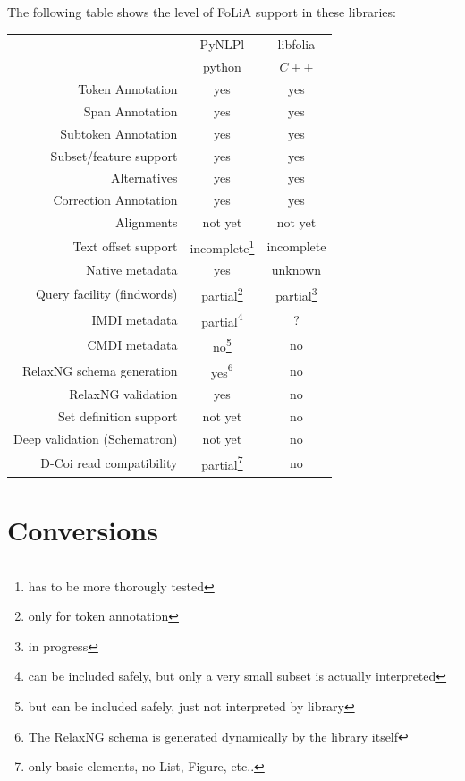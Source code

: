 \documentclass[a4paper,12pt]{report}
\begin{document}
The following table shows the level of FoLiA support in these libraries:

\begin{tabular}{|r|c|c|}
\hline
                        & PyNLPl & libfolia  \\
                        & python & $C++$ \\
\hline
Token Annotation        & yes & yes \\
Span Annotation         & yes & yes \\
Subtoken Annotation     & yes & yes \\
Subset/feature support  & yes & yes \\
Alternatives            & yes & yes \\
Correction Annotation   & yes & yes \\
Alignments              & not yet & not yet \\
Text offset support     & incomplete\footnote{has to be more thorougly tested} & incomplete \\
Native metadata         & yes & unknown \\
\hline
Query facility (findwords) & partial\footnote{only for token annotation} & partial\footnote{in progress} \\
\hline
IMDI metadata           & partial\footnote{can be included safely, but only a very small subset is actually interpreted} & ? \\
CMDI metadata           & no\footnote{but can be included safely, just not interpreted by library} & no \\
RelaxNG schema generation & yes\footnote{The RelaxNG schema is generated dynamically by the library itself} & no \\
RelaxNG validation      & yes & no \\
Set definition support  & not yet & no \\
Deep validation (Schematron)  & not yet & no \\
D-Coi read compatibility      & partial\footnote{only basic elements, no List, Figure, etc..} & no \\
\hline
\end{tabular}

\chapter{Conversions}
 
\end{document}
